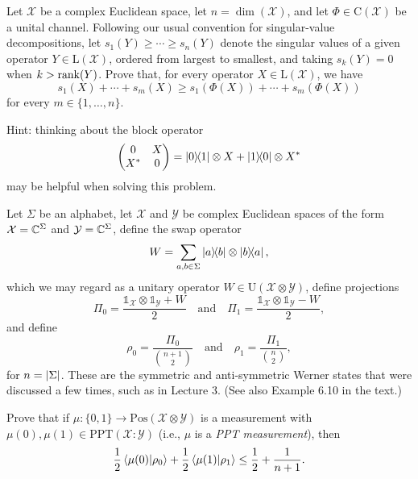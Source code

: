 \documentclass[boxes,pages,color=SeaGreen]{homework}
\newcommand{\X}{\mathcal{X}}
\newcommand{\Y}{\mathcal{Y}}
\newcommand{\I}{\mathbb{1}}
\newcommand{\Lin}{\mathrm{L}}
\newcommand{\Pos}{\mathrm{Pos}}
\newcommand{\Unitary}{\mathrm{U}}
\newcommand{\Channel}{\mathrm{C}}
\newcommand{\PPT}{\mathrm{PPT}}
\begin{document}
\begin{solution}
\end{solution}

\begin{problem}
Let $\X$ be a complex Euclidean space, let $n = \dim(\X)$, and let
$\Phi\in\Channel(\X)$ be a unital channel.
Following our usual convention for singular-value decompositions, let
$s_1(Y) \geq \cdots \geq s_n(Y)$ denote the singular values of a given
operator $Y\in\Lin(\X)$, ordered from largest to smallest, and taking
$s_k(Y) = 0$ when $k > \rank(Y)$.
Prove that, for every operator $X\in\Lin(\X)$, we have
\[
  s_1(X) + \cdots + s_m(X) \geq s_1(\Phi(X)) + \cdots + s_m(\Phi(X))
\]
for every $m \in \{1,\ldots,n\}$.

Hint: thinking about the block operator
\[
  \mqty(
  0   & X \\
  X^* & 0
  )
  = \ketbra{0}{1} \otimes X + \ketbra{1}{0} \otimes X^*
\]
may be helpful when solving this problem.
\end{problem}

\begin{solution}
\end{solution}

\begin{problem}
Let $\Sigma$ be an alphabet, let $\X$ and $\Y$ be complex Euclidean spaces of
the form $\X = \C^{\Sigma}$ and $\Y = \C^{\Sigma}$, define the
swap operator
\[
  W = \sum_{a,b\in\Sigma} \ketbra{a}{b} \otimes \ketbra{b}{a},
\]
which we may regard as a unitary operator $W\in\Unitary(\X\otimes\Y)$,
define projections
\[
  \Pi_0 = \frac{\I_{\X} \otimes \I_{\Y} + W}{2}
  \quad\text{and}\quad
  \Pi_1 = \frac{\I_{\X} \otimes \I_{\Y} - W}{2},
\]
and define
\[
  \rho_0 = \frac{\Pi_0}{\binom{n+1}{2}}
  \quad\text{and}\quad
  \rho_1 = \frac{\Pi_1}{\binom{n}{2}},
\]
for $n = \abs{\Sigma}$.
These are the symmetric and anti-symmetric Werner states that were discussed
a few times, such as in Lecture 3.
(See also Example 6.10 in the text.)

Prove that if $\mu: \{0,1\} \rightarrow \Pos(\X\otimes\Y)$ is a measurement with
$\mu(0), \mu(1) \in \PPT(\X \mathbin{:} \Y)$ (i.e., $\mu$ is a
\emph{PPT measurement}), then
\[
  \frac{1}{2}\ip{\mu(0)}{\rho_0} + \frac{1}{2}\ip{\mu(1)}{\rho_1}
  \leq \frac{1}{2} + \frac{1}{n+1}.
\]
\end{problem}

\begin{solution}
\end{solution}
\end{document}
